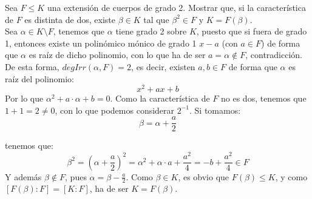 \begin{ejercicio} 
    Sea $F\leq K$ una extensión de cuerpos de grado 2. Mostrar que, si la característica de $F$ es distinta de dos, existe $\beta\in K$ tal que $\beta^2 \in F$ y $K = F(\beta)$.\\

    \noindent
    Sea $\alpha\in K\setminus F$, tenemos que $\alpha$ tiene grado 2 sobre $K$, puesto que si fuera de grado 1, entonces existe un polinómico mónico de grado 1 $x-a$ (con $a\in F$) de forma que $\alpha$ es raíz de dicho polinomio, con lo que ha de ser $a = \alpha\notin F$, contradicción. De esta forma, $deg Irr(\alpha,F)=2$, es decir, existen $a,b\in F$ de forma que $\alpha$ es raíz del polinomio:
    \begin{equation*}
        x^2+ax+b
    \end{equation*}
    Por lo que $\alpha^2 + a\cdot \alpha + b = 0$. Como la característica de $F$ no es dos, tenemos que $1+1 = 2 \neq 0$, con lo que podemos considerar $2^{-1}$. Si tomamos:
    \begin{equation*}
        \beta = \alpha + \frac{a}{2}
    \end{equation*}

    tenemos que:
    \begin{equation*}
        \beta^2 = {\left(\alpha+\frac{a}{2}\right)}^{2} = \alpha^2 + \alpha\cdot a + \frac{a^2}{4} = -b + \frac{a^{2}}{4} \in F
    \end{equation*}
    Y además $\beta\notin F$, pues $\alpha = \beta-\frac{a}{2}$. Como $\beta\in K$, es obvio que $F(\beta)\leq K$, y como $[F(\beta):F] = [K:F]$, ha de ser $K = F(\beta)$.
\end{ejercicio}

